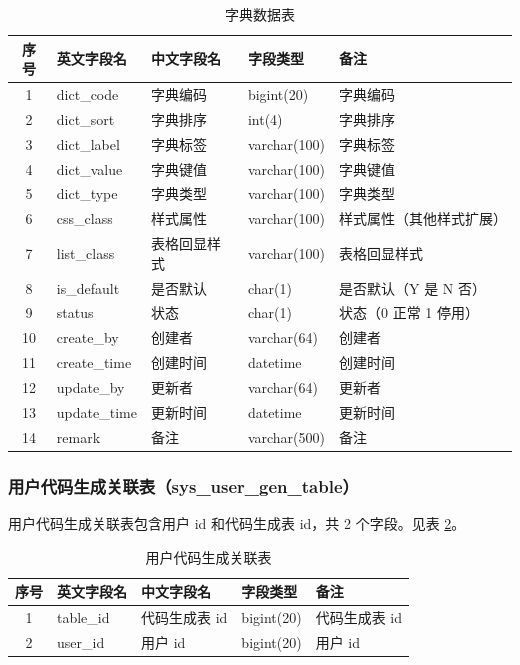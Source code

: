\documentclass{izdthesis}
\begin{document}
\begin{table}[H]
  \centering
  \caption{字典数据表}
  \label{tab4-10}
  \songti
  \begin{tabular}{c l l l p{4cm}}
    \toprule
    序号 & 英文字段名 & 中文字段名 & 字段类型 & 备注 \\
    \midrule
    1 & dict\_code & 字典编码 & bigint(20) & 字典编码 \\
    2 & dict\_sort & 字典排序 & int(4) & 字典排序 \\
    3 & dict\_label & 字典标签 & varchar(100) & 字典标签 \\
    4 & dict\_value & 字典键值 & varchar(100) & 字典键值 \\
    5 & dict\_type & 字典类型 & varchar(100) & 字典类型 \\
    6 & css\_class & 样式属性 & varchar(100) & 样式属性（其他样式扩展） \\
    7 & list\_class & 表格回显样式 & varchar(100) & 表格回显样式 \\
    8 & is\_default & 是否默认 & char(1) & 是否默认（Y 是 N 否） \\
    9 & status & 状态 & char(1) & 状态（0 正常 1 停用） \\
    10 & create\_by & 创建者 & varchar(64) & 创建者 \\
    11 & create\_time & 创建时间 & datetime & 创建时间 \\
    12 & update\_by & 更新者 & varchar(64) & 更新者 \\
    13 & update\_time & 更新时间 & datetime & 更新时间 \\
    14 & remark & 备注 & varchar(500) & 备注 \\
    \bottomrule
  \end{tabular}
\end{table}

\subsubsection{用户代码生成关联表（sys\_user\_gen\_table）}
用户代码生成关联表包含用户 id 和代码生成表 id，共 2 个字段。见表 \ref{tab4-11}。

\begin{table}[H]
  \centering
  \caption{用户代码生成关联表}
  \label{tab4-11}
  \songti
  \begin{tabular}{c l l l l}
    \toprule
    序号 & 英文字段名 & 中文字段名 & 字段类型 & 备注 \\
    \midrule
    1 & table\_id & 代码生成表 id & bigint(20) & 代码生成表 id \\
    2 & user\_id & 用户 id & bigint(20) & 用户 id \\
    \bottomrule
  \end{tabular}
\end{table}
\end{document}
